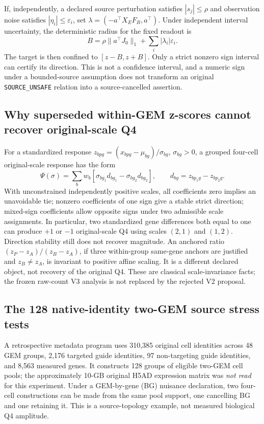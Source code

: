 If, independently, a declared source perturbation satisfies $|s_j|\le\rho$ and observation noise satisfies $|\eta_i|\le\varepsilon_i$, set $\lambda=(-a^\top X_EF_R,a^\top)$. Under independent interval uncertainty, the deterministic radius for the fixed readout is
\begin{equation}
B=\rho\|a^\top J_0\|_1+\sum_i|\lambda_i|\varepsilon_i.
\label{eq:source-radius}
\end{equation}
The target is then confined to $[z-B,z+B]$. Only a strict nonzero sign interval can certify its direction. This is not a confidence interval, and a numeric sign under a bounded-source assumption does not transform an original \texttt{SOURCE\_UNSAFE} relation into a source-cancelled assertion.

\subsection{Why superseded within-GEM z-scores cannot recover original-scale Q4}
For a standardized response $z_{bpg}=(x_{bpg}-\mu_{bg})/\sigma_{bg}$, $\sigma_{bg}>0$, a grouped four-cell original-scale response has the form
\[
\Psi(\sigma)=\sum_b w_b[\sigma_{bg_1}d_{bg_1}-\sigma_{bg_2}d_{bg_2}],\qquad d_{bg}=z_{bp_1g}-z_{bp_2g}.
\]
With unconstrained independently positive scales, all coefficients zero implies an unavoidable tie; nonzero coefficients of one sign give a stable strict direction; mixed-sign coefficients allow opposite signs under two admissible scale assignments. In particular, two standardized gene differences both equal to one can produce $+1$ or $-1$ original-scale Q4 using scales $(2,1)$ and $(1,2)$. Direction stability still does not recover magnitude. An anchored ratio $(z_P-z_A)/(z_B-z_A)$, if three within-group same-gene anchors are justified and $z_B\ne z_A$, is invariant to positive affine scaling. It is a different declared object, not recovery of the original Q4. These are classical scale-invariance facts; the frozen raw-count V3 analysis is not replaced by the rejected V2 proposal.

\subsection{The 128 native-identity two-GEM source stress tests}
A retrospective metadata program uses 310,385 original cell identities across 48 GEM groups, 2,176 targeted guide identities, 97 non-targeting guide identities, and 8,563 measured genes. It constructs 128 groups of eligible two-GEM cell pools; the approximately 10-GB original H5AD expression matrix was \emph{not read} for this experiment. Under a GEM-by-gene (BG) nuisance declaration, two four-cell constructions can be made from the same pool support, one cancelling BG and one retaining it. This is a source-topology example, not measured biological Q4 amplitude.

